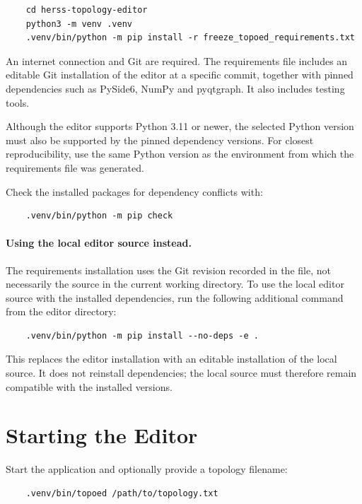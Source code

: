 \documentclass[a4paper, 12pt]{report}
\begin{document}
\begin{lstlisting}
	cd herss-topology-editor
	python3 -m venv .venv
	.venv/bin/python -m pip install -r freeze_topoed_requirements.txt
\end{lstlisting}

An internet connection and Git are required. The requirements file
includes an editable Git installation of the editor at a specific
commit, together with pinned dependencies such as PySide6, NumPy and
pyqtgraph. It also includes testing tools.

Although the editor supports Python 3.11 or newer, the selected Python
version must also be supported by the pinned dependency versions.
For closest reproducibility, use the same Python version as the
environment from which the requirements file was generated.

Check the installed packages for dependency conflicts with:

\begin{lstlisting}
	.venv/bin/python -m pip check
\end{lstlisting}

\paragraph{Using the local editor source instead.}
The requirements installation uses the Git revision recorded in the
file, not necessarily the source in the current working directory.
To use the local editor source with the installed dependencies,
run the following additional command from the editor directory:

\begin{lstlisting}
	.venv/bin/python -m pip install --no-deps -e .
\end{lstlisting}

This replaces the editor installation with an editable installation
of the local source. It does not reinstall dependencies; the local
source must therefore remain compatible with the installed versions.

\section{Starting the Editor}

Start the application and optionally provide a topology filename:

\begin{lstlisting}
	.venv/bin/topoed /path/to/topology.txt
\end{lstlisting}
\end{document}
